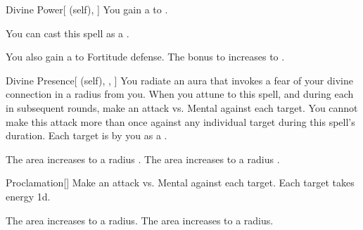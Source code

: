 \lowercase{\hypertarget{spell:Divine Power}{}}\label{spell:Divine Power}
\begin{attuneability}[Rank 3]{\hypertarget{spell:Divine Power}{Divine Power}}[ (self), ]
You gain a   to .

You can cast this spell as a .

\rankline
{} You also gain a   to Fortitude defense.
 The bonus to  increases to .
\end{attuneability}
\vspace{0.25em}



\lowercase{\hypertarget{spell:Divine Presence}{}}\label{spell:Divine Presence}
\begin{attuneability}[Rank 3]{\hypertarget{spell:Divine Presence}{Divine Presence}}[ (self), , ]
You radiate an aura that invokes a fear of your divine connection in a \areamed radius  from you.
When you attune to this spell, and during each  in subsequent rounds, make an attack vs. Mental against each target.
You cannot make this attack more than once against any individual target during this spell's duration.
\hit Each target is  by you as a .

\rankline
{} The area increases to a \arealarge radius .
 The area increases to a \areahuge radius .
\end{attuneability}
\vspace{0.25em}



\lowercase{\hypertarget{spell:Proclamation}{}}\label{spell:Proclamation}
\begin{freeability}[Rank 3]{\hypertarget{spell:Proclamation}{Proclamation}}[]
Make an attack vs. Mental against each target.
\hit Each target takes energy  \minus1d.

\rankline
{} The area increases to a \arealarge radius.
 The area increases to a \areahuge radius.
\end{freeability}
\vspace{0.25em}



